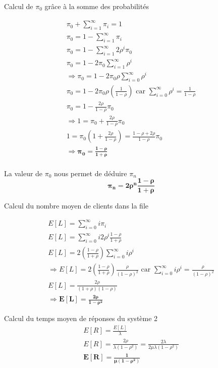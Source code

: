 \documentclass[12pt, a4paper]{article}
\begin{document}
\quad Calcul de $\pi_{0}$ gr\^ace \`a la somme des probabilit\'es

\begin{gather*}
\pi_{0}+\sum_{i=1}^{\infty} \pi_{i} = 1 \\
\pi_{0}=1-\sum_{i=1}^{\infty}\pi_{i} \\
\pi_{0}=1-\sum_{i=1}^{\infty}2\rho^{i}\pi_{0} \\
\pi_{0}=1-2\pi_{0} \sum_{i=1}^{\infty}\rho^{i} \\
\Rightarrow \pi_{0}=1-2\pi_{0}\rho\sum_{i=0}^{\infty}\rho^{i} \\
\pi_{0}=1-2\pi_{0}\rho\left(\frac{1}{1-\rho}\right) \text{ car } \sum_{i=0}^{\infty}\rho^{i}=\frac{1}{1-\rho}\\
\pi_{0}=1-\frac{2\rho}{1-\rho}\pi_{0} \\
\Rightarrow 1 = \pi_{0}+\frac{2\rho}{1-\rho}\pi_{0} \\
1=\pi_{0}\left(1+\frac{2\rho}{1-\rho}\right)=\frac{1-\rho+2\rho}{1-\rho}\pi_{0} \\
\Rightarrow \bm{\pi_{0}=\frac{1-\rho}{1+\rho}} \\
\end{gather*}

\quad La valeur de $\pi_{0}$ nous permet de d\'eduire $\pi_{n}$
\[\bm{\pi_{n}=2\rho^{n}\frac{1-\rho}{1+\rho}}\]

\newpage
\quad Calcul du nombre moyen de clients dans la file

\begin{gather*}
E[L]=\sum_{i=0}^{\infty}i\pi_{i} \\
E[L]=\sum_{i=0}^{\infty}i2\rho^{i}\frac{1-\rho}{1+\rho} \\
E[L]=2\left(\frac{1-\rho}{1+\rho}\right)\sum_{i=0}^{\infty}i\rho^{i} \\
\Rightarrow E[L]=2\left(\frac{1-\rho}{1+\rho}\right)\frac{\rho}{\left(1-\rho\right)^{2}} \text{ car } \sum_{i=0}^{\infty}i\rho^{i} = \frac{\rho}{\left(1-\rho\right)^{2}} \\
E[L]=\frac{2\rho}{\left(1+\rho\right)\left(1-\rho\right)} \\
\Rightarrow \bm{E[L]=\frac{2\rho}{1-\rho^{2}}}
\end{gather*}

\quad Calcul du temps moyen de r\'eponses du syst\`eme 2
\begin{gather*}
E[R]=\frac{E[L]}{\lambda} \\
E[R]=\frac{2\rho}{\lambda\left(1-\rho^{2}\right)} = \frac{2\lambda}{2\mu\lambda\left(1-\rho^{2}\right)} \\
\bm{E[R]=\frac{1}{\mu\left(1-\rho^{2}\right)}}
\end{gather*}
\end{document}
